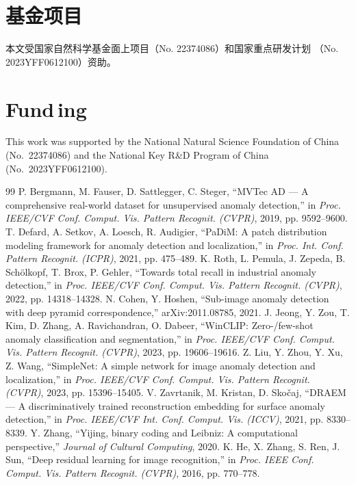 \documentclass[journal,10pt]{IEEEtran}
\begin{document}
\section*{基金项目}
本文受国家自然科学基金面上项目（No. 22374086）和国家重点研发计划
（No. 2023YFF0612100）资助。

\section*{Fund\,ing}
This work was supported by the National Natural Science Foundation of China
(No.\ 22374086) and the National Key R\&D Program of China (No.\ 2023YFF0612100).


\begin{thebibliography}{99}
 P. Bergmann, M. Fauser, D. Sattlegger, C. Steger,
``MVTec AD --- A comprehensive real-world dataset for unsupervised anomaly
detection,'' in \emph{Proc. IEEE/CVF Conf. Comput. Vis. Pattern Recognit.
(CVPR)}, 2019, pp. 9592--9600.
 T. Defard, A. Setkov, A. Loesch, R. Audigier, ``PaDiM:
A patch distribution modeling framework for anomaly detection and
localization,'' in \emph{Proc. Int. Conf. Pattern Recognit. (ICPR)}, 2021,
pp. 475--489.
 K. Roth, L. Pemula, J. Zepeda, B. Sch\"olkopf,
T. Brox, P. Gehler, ``Towards total recall in industrial anomaly detection,'' in
\emph{Proc. IEEE/CVF Conf. Comput. Vis. Pattern Recognit. (CVPR)}, 2022,
pp. 14318--14328.
 N. Cohen, Y. Hoshen, ``Sub-image anomaly detection with
deep pyramid correspondence,'' arXiv:2011.08785, 2021.
 J. Jeong, Y. Zou, T. Kim, D. Zhang, A. Ravichandran,
O. Dabeer, ``WinCLIP: Zero-/few-shot anomaly classification and segmentation,'' in
\emph{Proc. IEEE/CVF Conf. Comput. Vis. Pattern Recognit. (CVPR)}, 2023,
pp. 19606--19616.
 Z. Liu, Y. Zhou, Y. Xu, Z. Wang, ``SimpleNet: A simple
network for image anomaly detection and localization,'' in \emph{Proc.
IEEE/CVF Conf. Comput. Vis. Pattern Recognit. (CVPR)}, 2023, pp. 15396--15405.
 V. Zavrtanik, M. Kristan, D. Sko\v{c}aj, ``DRAEM ---
A discriminatively trained reconstruction embedding for surface anomaly
detection,'' in \emph{Proc. IEEE/CVF Int. Conf. Comput. Vis. (ICCV)}, 2021,
pp. 8330--8339.
 Y. Zhang, ``Yijing, binary coding and Leibniz: A
computational perspective,'' \emph{Journal of Cultural Computing}, 2020.
 K. He, X. Zhang, S. Ren, J. Sun, ``Deep residual learning
for image recognition,'' in \emph{Proc. IEEE Conf. Comput. Vis. Pattern
Recognit. (CVPR)}, 2016, pp. 770--778.
\end{thebibliography}
\end{document}
